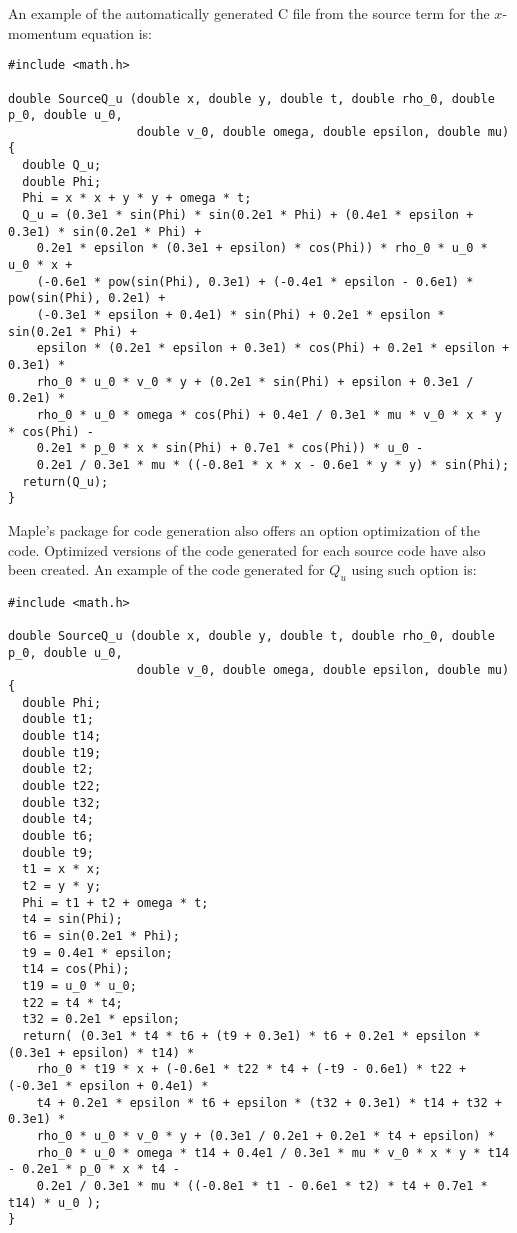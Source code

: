 \documentclass[10pt]{article}
\begin{document}
An example of the automatically generated C file from the source term for the $x$-momentum equation is:
\begin{verbatim}
#include <math.h>

double SourceQ_u (double x, double y, double t, double rho_0, double p_0, double u_0,
                  double v_0, double omega, double epsilon, double mu)
{
  double Q_u;
  double Phi;
  Phi = x * x + y * y + omega * t;
  Q_u = (0.3e1 * sin(Phi) * sin(0.2e1 * Phi) + (0.4e1 * epsilon + 0.3e1) * sin(0.2e1 * Phi) +
    0.2e1 * epsilon * (0.3e1 + epsilon) * cos(Phi)) * rho_0 * u_0 * u_0 * x +
    (-0.6e1 * pow(sin(Phi), 0.3e1) + (-0.4e1 * epsilon - 0.6e1) * pow(sin(Phi), 0.2e1) +
    (-0.3e1 * epsilon + 0.4e1) * sin(Phi) + 0.2e1 * epsilon * sin(0.2e1 * Phi) +
    epsilon * (0.2e1 * epsilon + 0.3e1) * cos(Phi) + 0.2e1 * epsilon + 0.3e1) *
    rho_0 * u_0 * v_0 * y + (0.2e1 * sin(Phi) + epsilon + 0.3e1 / 0.2e1) *
    rho_0 * u_0 * omega * cos(Phi) + 0.4e1 / 0.3e1 * mu * v_0 * x * y * cos(Phi) -
    0.2e1 * p_0 * x * sin(Phi) + 0.7e1 * cos(Phi)) * u_0 -
    0.2e1 / 0.3e1 * mu * ((-0.8e1 * x * x - 0.6e1 * y * y) * sin(Phi);
  return(Q_u);
}
\end{verbatim}
Maple's package for code generation also offers an option optimization of the code. Optimized versions of the code generated for each source code have also been created. An example of the code generated for $Q_u$ using such option is:
\begin{verbatim}
#include <math.h>

double SourceQ_u (double x, double y, double t, double rho_0, double p_0, double u_0,
                  double v_0, double omega, double epsilon, double mu)
{
  double Phi;
  double t1;
  double t14;
  double t19;
  double t2;
  double t22;
  double t32;
  double t4;
  double t6;
  double t9;
  t1 = x * x;
  t2 = y * y;
  Phi = t1 + t2 + omega * t;
  t4 = sin(Phi);
  t6 = sin(0.2e1 * Phi);
  t9 = 0.4e1 * epsilon;
  t14 = cos(Phi);
  t19 = u_0 * u_0;
  t22 = t4 * t4;
  t32 = 0.2e1 * epsilon;
  return( (0.3e1 * t4 * t6 + (t9 + 0.3e1) * t6 + 0.2e1 * epsilon * (0.3e1 + epsilon) * t14) *
    rho_0 * t19 * x + (-0.6e1 * t22 * t4 + (-t9 - 0.6e1) * t22 + (-0.3e1 * epsilon + 0.4e1) *
    t4 + 0.2e1 * epsilon * t6 + epsilon * (t32 + 0.3e1) * t14 + t32 + 0.3e1) *
    rho_0 * u_0 * v_0 * y + (0.3e1 / 0.2e1 + 0.2e1 * t4 + epsilon) *
    rho_0 * u_0 * omega * t14 + 0.4e1 / 0.3e1 * mu * v_0 * x * y * t14 - 0.2e1 * p_0 * x * t4 -
    0.2e1 / 0.3e1 * mu * ((-0.8e1 * t1 - 0.6e1 * t2) * t4 + 0.7e1 * t14) * u_0 );
}
\end{verbatim}
\end{document}
